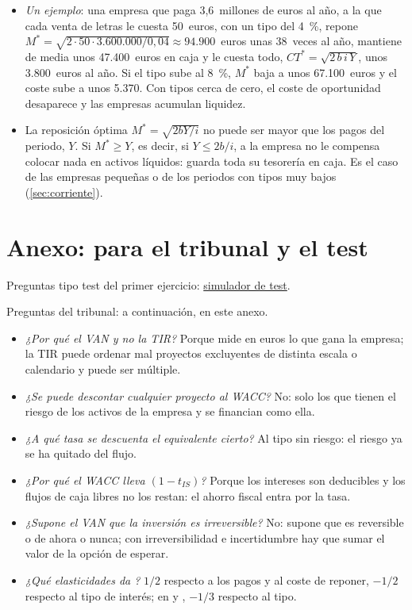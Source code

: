 \documentclass[11pt]{article}
\begin{document}
\begin{itemize}
\item \emph{Un ejemplo}: una empresa que paga 3,6~millones de euros al año, a la que cada venta de letras le cuesta 50~euros, con un tipo del 4~\%, repone $M^{*}=\sqrt{2\cdot50\cdot3.600.000/0{,}04}\approx94.900$~euros unas 38~veces al año, mantiene de media unos 47.400~euros en caja y le cuesta todo, $CT^*=\sqrt{2\,b\,i\,Y}$, unos 3.800~euros al año. Si el tipo sube al 8~\%, $M^*$ baja a unos 67.100~euros y el coste sube a unos 5.370. Con tipos cerca de cero, el coste de oportunidad desaparece y las empresas acumulan liquidez.
\item La reposición óptima $M^*=\sqrt{2bY/i}$ no puede ser mayor que los pagos del periodo, $Y$. Si $M^*\geq Y$, es decir, si $Y\leq 2b/i$, a la empresa no le compensa colocar nada en activos líquidos: guarda toda su tesorería en caja\nocite{Tobin1956Interest}. Es el caso de las empresas pequeñas o de los periodos con tipos muy bajos (\ref{sec:corriente}).\findemo
\end{itemize}

\section{Anexo: para el tribunal y el test}\label{anexo:test}

\begin{anotaciones}
Preguntas tipo test del primer ejercicio: \href{https://www.victorgutierrezmarcos.es/oposicion/temario/primer-ejercicio/test/simulador.html?tema=3.B.2}{simulador de test}.

Preguntas del tribunal: a continuación, en este anexo.
\end{anotaciones}

\begin{itemize}
\item \emph{¿Por qué el VAN y no la TIR?} Porque mide en euros lo que gana la empresa; la TIR puede ordenar mal proyectos excluyentes de distinta escala o calendario y puede ser múltiple.
\item \emph{¿Se puede descontar cualquier proyecto al WACC?} No: solo los que tienen el riesgo de los activos de la empresa y se financian como ella.
\item \emph{¿A qué tasa se descuenta el equivalente cierto?} Al tipo sin riesgo: el riesgo ya se ha quitado del flujo.
\item \emph{¿Por qué el WACC lleva $(1-t_{IS})$?} Porque los intereses son deducibles y los flujos de caja libres no los restan: el ahorro fiscal entra por la tasa.
\item \emph{¿Supone el VAN que la inversión es irreversible?} No: supone que es reversible o de ahora o nunca; con irreversibilidad e incertidumbre hay que sumar el valor de la opción de esperar.
\item \emph{¿Qué elasticidades da ?} $1/2$ respecto a los pagos y al coste de reponer, $-1/2$ respecto al tipo de interés; en  y , $-1/3$ respecto al tipo.
\end{itemize}
\end{document}
